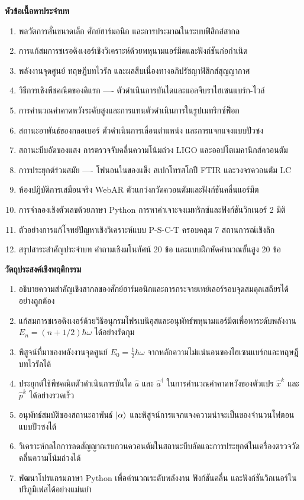 \begin{lessonplanbox}
\noindent\textbf{หัวข้อเนื้อหาประจำบท}
\begin{enumerate}
    \item พลวัตการสั่นขนาดเล็ก ศักย์ฮาร์มอนิก และการประมาณในระบบฟิสิกส์สากล
    \item การแก้สมการชเรอดิงเงอร์เชิงวิเคราะห์ด้วยพหุนามแอร์มีตและฟังก์ชันก่อกำเนิด
    \item พลังงานจุดศูนย์ ทฤษฎีบทไวรัล และผลสืบเนื่องทางอภิปรัชญาฟิสิกส์สุญญากาศ
    \item วิธีการเชิงพีชคณิตของดิแรก ---- ตัวดำเนินการบันไดและแอลจีบราไฮเซนแบร์ก-ไวล์
    \item การคำนวณค่าคาดหวังระดับสูงและการแทนตัวดำเนินการในรูปเมทริกซ์ฟ็อก
    \item สถานะอาพันธ์ของกลอเบอร์ ตัวดำเนินการเลื่อนตำแหน่ง และการแจกแจงแบบปัวซง
    \item สถานะบีบอัดของแสง การตรวจจับคลื่นความโน้มถ่วง LIGO และออปโตเมคานิกส์ควอนตัม
    \item การประยุกต์ร่วมสมัย ---- โฟนอนในของแข็ง สเปกโทรสโกปี FTIR และวงจรควอนตัม LC
    \item ห้องปฏิบัติการเสมือนจริง WebAR ตัวแกว่งกวัดควอนตัมและฟังก์ชันคลื่นแอร์มีต
    \item การจำลองเชิงตัวเลขด้วยภาษา Python การหาค่าเจาะจงเมทริกซ์และฟังก์ชันวิกเนอร์ 2 มิติ
    \item ตัวอย่างการแก้โจทย์ปัญหาเชิงวิเคราะห์แบบ P-S-C-T ครอบคลุม 7 สถานการณ์เชิงลึก
    \item สรุปสาระสำคัญประจำบท คำถามเชิงมโนทัศน์ 20 ข้อ และแบบฝึกหัดคำนวณขั้นสูง 20 ข้อ
\end{enumerate}

\noindent\textbf{วัตถุประสงค์เชิงพฤติกรรม}
\begin{enumerate}
    \item อธิบายความสำคัญเชิงสากลของศักย์ฮาร์มอนิกและการกระจายเทย์เลอร์รอบจุดสมดุลเสถียรได้อย่างถูกต้อง
    \item แก้สมการชเรอดิงเงอร์ด้วยวิธีอนุกรมโฟรเบนิอุสและอนุพัทธ์พหุนามแอร์มีตเพื่อหาระดับพลังงาน $E_n = (n + 1/2)\hbar\omega$ ได้อย่างรัดกุม
    \item พิสูจน์ที่มาของพลังงานจุดศูนย์ $E_0 = \frac{1}{2}\hbar\omega$ จากหลักความไม่แน่นอนของไฮเซนแบร์กและทฤษฎีบทไวรัลได้
    \item ประยุกต์ใช้พีชคณิตตัวดำเนินการบันได $\hat{a}$ และ $\hat{a}^\dagger$ ในการคำนวณค่าคาดหวังของตัวแปร $\hat{x}^k$ และ $\hat{p}^k$ ได้อย่างรวดเร็ว
    \item อนุพัทธ์สมบัติของสถานะอาพันธ์ $\ket{\alpha}$ และพิสูจน์การแจกแจงความน่าจะเป็นของจำนวนโฟตอนแบบปัวซงได้
    \item วิเคราะห์กลไกการลดสัญญาณรบกวนควอนตัมในสถานะบีบอัดและการประยุกต์ในเครื่องตรวจวัดคลื่นความโน้มถ่วงได้
    \item พัฒนาโปรแกรมภาษา Python เพื่อคำนวณระดับพลังงาน ฟังก์ชันคลื่น และฟังก์ชันวิกเนอร์ในปริภูมิเฟสได้อย่างแม่นยำ
\end{enumerate}
\end{lessonplanbox}

